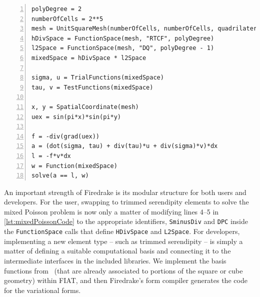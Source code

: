 \documentclass[format=acmsmall,screen,timestamp=false,a4paper]{acmart}
\newcommand\akg[1]{\textbf{\textcolor[rgb]{.5,0,1}{[Andrew: #1]}}}
\newcommand\josh[1]{\textbf{\textcolor[rgb]{0,.5,1}{[Josh: #1]}}}
\begin{document}
  
\begin{lstlisting}[float=htpb,caption={Basic Firedrake implementation of the mixed Poisson problem showcasing where to choose the elements that are used and how to create the equations in Firedrake's notation.}, label={lst:mixedPoissonCode}, numbers=left, firstnumber=1, xleftmargin=20pt,  xrightmargin=20pt]
polyDegree = 2
numberOfCells = 2**5
mesh = UnitSquareMesh(numberOfCells, numberOfCells, quadrilateral=True)
hDivSpace = FunctionSpace(mesh, "RTCF", polyDegree)
l2Space = FunctionSpace(mesh, "DQ", polyDegree - 1)
mixedSpace = hDivSpace * l2Space

sigma, u = TrialFunctions(mixedSpace)
tau, v = TestFunctions(mixedSpace)

x, y = SpatialCoordinate(mesh)
uex = sin(pi*x)*sin(pi*y)

f = -div(grad(uex))
a = (dot(sigma, tau) + div(tau)*u + div(sigma)*v)*dx
l = -f*v*dx
w = Function(mixedSpace)
solve(a == l, w)
\end{lstlisting}


  
  
An important strength of Firedrake is its modular structure for both users and developers.
For the user, swapping to trimmed serendipity elements to solve the mixed Poisson problem is now only a matter of modifying lines 4--5 in \cref{lst:mixedPoissonCode} to the appropriate identifiers, \texttt{SminusDiv} and \texttt{DPC} inside the \texttt{FunctionSpace} calls that define \texttt{HDivSpace} and \texttt{L2Space}.
   For developers, implementing a new element type -- such as trimmed serendipity -- is simply a matter of defining a suitable computational basis and connecting it to the intermediate interfaces in the included libraries.  We implement the basis functions from~\cite{gillette2019computational} (that are already associated to portions of the square or cube geometry) within FIAT, and then Firedrake's form compiler generates the code for the variational forms.
   
\end{document}
